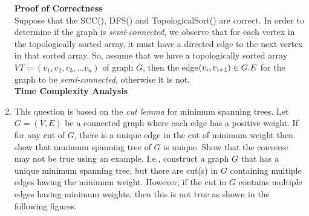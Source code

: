 \documentclass[12pt]{article}
\begin{document}
\begin{enumerate}
\textbf{Proof of Correctness}\\
Suppose that the SCC(), DFS() and TopologicalSort() are correct. In order to determine if the graph is {\em semi-connected}, we observe that for each vertex in the topologically sorted array, it must have a directed edge to the next vertex in that sorted array. So, assume that we have a topologically sorted array $VT= (v_1, v_2, v_3, ... v_n)$ of graph $G$, then the edge$(v_i, v\textsubscript{i+1}) \in G.E$ for the graph to be {\em semi-connected}, otherwise it is not.
\\
\textbf{Time Complexity Analysis}\\

\item \color{blue} This question is based on the {\em cut lemma} for minimum spanning trees. Let $G=(V,E)$ be a connected graph where each edge has a positive weight. If for any cut of $G$, there is a unique edge in the cut of minimum weight then show that minimum spanning tree of $G$ is unique. Show that the converse may not be true using an example. I.e.,  construct a graph $G$ that has a unique minimum spanning tree, but there are cut(s) in $G$ containing multiple edges  having the minimum weight. However, if the cut in $G$ contains multiple edges having minimum weights, then this is not true as shown in the following figures. 


\end{enumerate}
\end{document}
